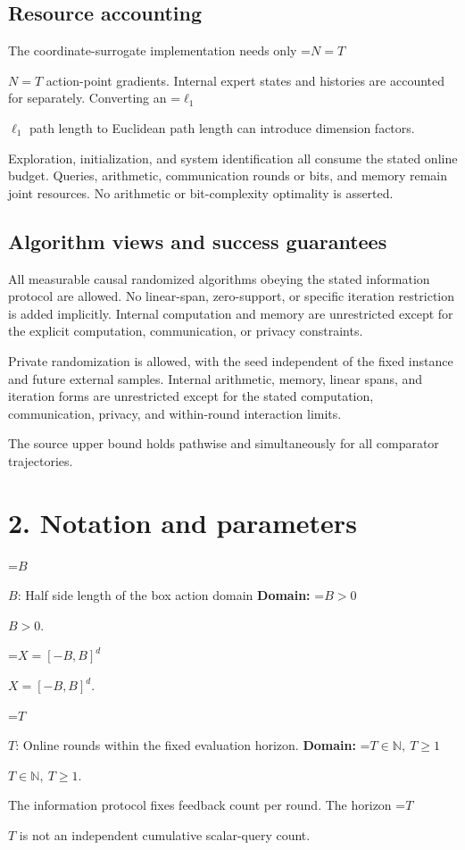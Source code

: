 \documentclass[10pt,a4paper]{article}
\newcommand{\AtlasMath}[1]{\par\begingroup\centering\setbox0=\hbox{$\displaystyle #1$}\ifdim\wd0>1.4\linewidth\typeout{ATLAS WIDE FORMULA: \the\wd0}\fi\ifdim\wd0>\linewidth\resizebox{\linewidth}{!}{\box0}\else\box0\fi\par\endgroup}
\newcommand{\AtlasInlineMath}[1]{\begingroup\setbox0=\hbox{$#1$}\ifdim\wd0>.4\linewidth\endgroup\AtlasMath{#1}\else\endgroup$#1$\fi}
\begin{document}
\subsection{Resource accounting}
The coordinate-surrogate implementation needs only \AtlasInlineMath{N=T} action-point gradients. Internal expert states and histories are accounted for separately. Converting an \AtlasInlineMath{\ell_1} path length to Euclidean path length can introduce dimension factors.

Exploration, initialization, and system identification all consume the stated online budget. Queries, arithmetic, communication rounds or bits, and memory remain joint resources. No arithmetic or bit-complexity optimality is asserted.

\subsection{Algorithm views and success guarantees}
All measurable causal randomized algorithms obeying the stated information protocol are allowed. No linear-span, zero-support, or specific iteration restriction is added implicitly. Internal computation and memory are unrestricted except for the explicit computation, communication, or privacy constraints.

Private randomization is allowed, with the seed independent of the fixed instance and future external samples. Internal arithmetic, memory, linear spans, and iteration forms are unrestricted except for the stated computation, communication, privacy, and within-round interaction limits.

The source upper bound holds pathwise and simultaneously for all comparator trajectories.

\section{2. Notation and parameters}
\AtlasInlineMath{B}: Half side length of the box action domain \textbf{Domain:} \AtlasInlineMath{B>0}.

\AtlasInlineMath{X=[-B,B]^d}.

\AtlasInlineMath{T}: Online rounds within the fixed evaluation horizon. \textbf{Domain:} \AtlasInlineMath{T\in\mathbb N,\ T\ge1}.

The information protocol fixes feedback count per round. The horizon \AtlasInlineMath{T} is not an independent cumulative scalar-query count.
\end{document}
